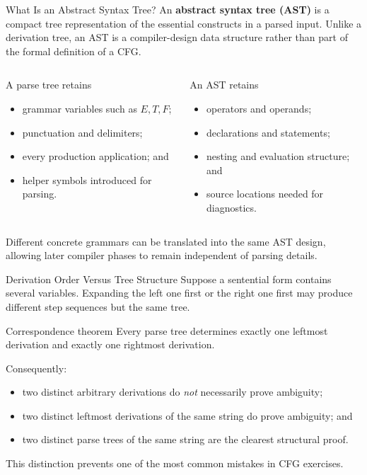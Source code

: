 \documentclass[10pt]{beamer}
\begin{document}
\begin{frame}{What Is an Abstract Syntax Tree?}
  \small
  An \textbf{abstract syntax tree (AST)} is a compact tree representation of
  the essential constructs in a parsed input. Unlike a derivation tree, an AST
  is a compiler-design data structure rather than part of the formal
  definition of a CFG.
  \pause
  \begin{columns}[T]
    \begin{block}{A parse tree retains}
      \begin{itemize}
        \item grammar variables such as $E,T,F$;
        \item punctuation and delimiters;
        \item every production application; and
        \item helper symbols introduced for parsing.
      \end{itemize}
    \end{block}
    \begin{block}{An AST retains}
      \begin{itemize}
        \item operators and operands;
        \item declarations and statements;
        \item nesting and evaluation structure; and
        \item source locations needed for diagnostics.
      \end{itemize}
    \end{block}
  \end{columns}
  \pause
  Different concrete grammars can be translated into the same AST design,
  allowing later compiler phases to remain independent of parsing details.
\end{frame}

\begin{frame}{Derivation Order Versus Tree Structure}
  Suppose a sentential form contains several variables. Expanding the left one first or the right one
  first may produce different step sequences but the same tree.
  \begin{block}{Correspondence theorem}
    Every parse tree determines exactly one leftmost derivation and exactly one rightmost derivation.
  \end{block}
  Consequently:
  \begin{itemize}
    \item two distinct arbitrary derivations do \emph{not} necessarily prove ambiguity;
    \item two distinct leftmost derivations of the same string do prove ambiguity; and
    \item two distinct parse trees of the same string are the clearest structural proof.
  \end{itemize}
  This distinction prevents one of the most common mistakes in CFG exercises.
\end{frame}
\end{document}
